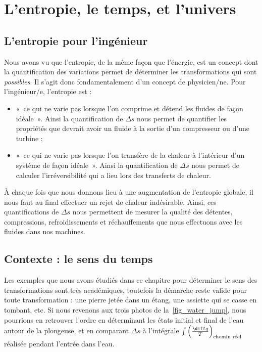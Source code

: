 \section{L’entropie, le temps, et l’univers}

	\subsection{L’entropie pour l’ingénieur}

		Nous avons vu que l’entropie, de la même façon que l’énergie, est un concept dont la quantification des variations permet de déterminer les transformations qui sont \emph{possibles}. Il s’agit donc fondamentalement d’un concept de physicien/ne. Pour l’ingénieur/e, l’entropie est :
		\begin{itemize}
			\item «~ce qui ne varie pas lorsque l’on comprime et détend les fluides de façon idéale~». Ainsi la quantification de $\Delta s$ nous permet de quantifier les propriétés que devrait avoir un fluide à la sortie d’un compresseur ou d’une turbine ;
			\item «~ce qui ne varie pas lorsque l’on transfère de la chaleur à l’intérieur d’un système de façon idéale~». Ainsi la quantification de $\Delta s$ nous permet de calculer l’irréversibilité qui a lieu lors des transferts de chaleur.
		\end{itemize}

	À chaque fois que nous donnons lieu à une augmentation de l’entropie globale, il nous faut au final effectuer un rejet de chaleur indésirable. Ainsi, ces quantifications de $\Delta s$ nous permettent de mesurer la qualité des détentes, compressions, refroidissements et réchauffements que nous effectuons avec les fluides dans nos machines.

	\subsection{Contexte : le sens du temps}
				
		Les exemples que nous avons étudiés dans ce chapitre pour déterminer le sens des transformations sont très académiques, toutefois la démarche reste valide pour toute transformation : une pierre jetée dans un étang, une assiette qui se casse en tombant, etc. Si nous revenons aux trois photos de la~\cref{fig_water_jump}, nous pourrions en retrouver l’ordre en déterminant les états initial et final de l’eau autour de la plongeuse, et en comparant $\Delta s$ à l’intégrale $\int \left(\frac{\diff q}{T}\right)_\text{chemin réel}$ réalisée pendant l’entrée dans l’eau.
		
